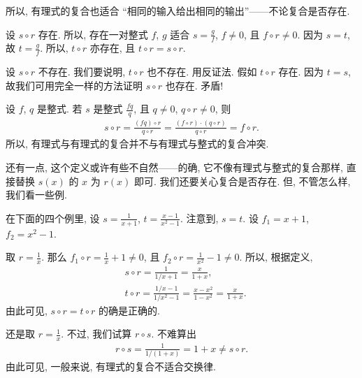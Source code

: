 \begin{remark}
    所以, 有理式的复合也适合 ``相同的输入给出相同的输出''——不论复合是否存在.
\end{remark}

\begin{pf}
    设 $s \circ r$ 存在. 所以, 存在一对整式 $f$, $g$ 适合 $s = \frac{g}{f}$, $f \neq 0$, 且 $f \circ r \neq 0$. 因为 $s = t$, 故 $t = \frac{g}{f}$. 所以, $t \circ r$ 亦存在, 且 $t \circ r = s \circ r$.

    设 $s \circ r$ 不存在. 我们要说明, $t \circ r$ 也不存在. 用反证法. 假如 $t \circ r$ 存在. 因为 $t = s$, 故我们可用完全一样的方法证明 $s \circ r$ 也存在. 矛盾!
\end{pf}

\begin{remark}
    设 $f$, $q$ 是整式. 若 $s$ 是整式 $\frac{fq}{q}$, 且 $q \neq 0$, $q \circ r \neq 0$, 则
    \begin{align*}
        s \circ r = \frac{(fq) \circ r}{q \circ r} = \frac{(f \circ r) \cdot (q \circ r)}{q \circ r} = f \circ r.
    \end{align*}
    所以, 有理式与有理式的复合并不与有理式与整式的复合冲突.
\end{remark}

还有一点, 这个定义或许有些不自然——的确, 它不像有理式与整式的复合那样, 直接替换 $s(x)$ 的 $x$ 为 $r(x)$ 即可. 我们还要关心复合是否存在. 但, 不管怎么样, 我们看一些例.

在下面的四个例里, 设 $s = \frac{1}{x+1}$, $t = \frac{x-1}{x^2-1}$. 注意到, $s = t$. 设 $f_1 = x+1$, $f_2 = x^2 - 1$.

\begin{example}
    取 $r = \frac{1}{x}$. 那么 $f_1 \circ r = \frac{1}{x} + 1 \neq 0$, 且 $f_2 \circ r = \frac{1}{x^2} - 1 \neq 0$. 所以, 根据定义,
    \begin{align*}
         & s \circ r = \frac{1}{1/x + 1} = \frac{x}{1 + x},                                   \\
         & t \circ r = \frac{1/x - 1}{1/x^2 - 1} = \frac{x - x^2}{1 - x^2} = \frac{x}{1 + x}.
    \end{align*}
    由此可见, $s \circ r = t \circ r$ 的确是正确的.
\end{example}

\begin{example}
    还是取 $r = \frac{1}{x}$. 不过, 我们试算 $r \circ s$. 不难算出
    \begin{align*}
        r \circ s = \frac{1}{1/(1 + x)} = 1 + x \neq s \circ r.
    \end{align*}
    由此可见, 一般来说, 有理式的复合不适合交换律.
\end{example}

